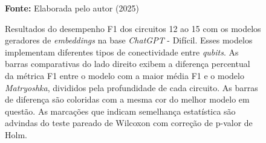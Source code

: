 \begin{figure}
\caption{Resultados do desempenho F1 dos circuitos 12 ao 15 com os modelos geradores de \textit{embeddings} na base \textit{ChatGPT} - Difícil. Esses modelos implementam diferentes tipos de conectividade entre \textit{qubits}. As barras comparativas do lado direito exibem a diferença percentual da métrica F1 entre o modelo com a maior média F1 e o modelo \textit{Matryoshka}, divididos pela profundidade de cada circuito. As barras de diferença são coloridas com a mesma cor do melhor modelo em questão. As marcações que indicam semelhança estatística são advindas do teste pareado de Wilcoxon com correção de p-valor de Holm.}
\label{fig:model_transformer:hard:g3}
     \centering
    \centering

      \par\medskip\ABNTEXfontereduzida\selectfont\textbf{Fonte:} Elaborada pelo autor (2025) \par\medskip
\end{figure}